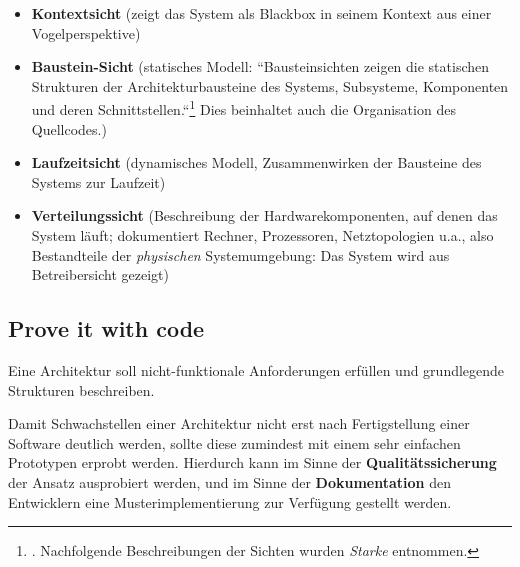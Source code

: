 \begin{itemize}
    \item \textbf{Kontextsicht} (zeigt das System als Blackbox in seinem Kontext aus einer Vogelperspektive)
    \item \textbf{Baustein-Sicht} (statisches Modell: ``Bausteinsichten zeigen die statischen Strukturen der Architekturbausteine des Systems, Subsysteme, Komponenten und deren Schnittstellen.``\footnote{
        \cite[81]{Sta14e}.
        Nachfolgende Beschreibungen der Sichten wurden \textit{Starke} entnommen.
    } Dies beinhaltet auch die Organisation des Quellcodes.)
    \item \textbf{Laufzeitsicht} (dynamisches Modell, Zusammenwirken der Bausteine des Systems zur Laufzeit)
    \item \textbf{Verteilungssicht} (Beschreibung der Hardwarekomponenten, auf denen das System läuft; dokumentiert Rechner, Prozessoren, Netztopologien u.a., also Bestandteile der \textit{physischen} Systemumgebung: Das System wird aus Betreibersicht gezeigt)
\end{itemize}

\subsection*{Prove it with code}

\begin{tcolorbox}
    Eine Architektur soll nicht-funktionale Anforderungen erfüllen und grundlegende Strukturen beschreiben.
\end{tcolorbox}

\noindent
Damit Schwachstellen einer Architektur nicht erst nach Fertigstellung einer Software deutlich werden, sollte diese zumindest mit einem sehr einfachen Prototypen erprobt werden.
Hierdurch kann im Sinne der \textbf{Qualitätssicherung} der Ansatz ausprobiert werden, und im Sinne der \textbf{Dokumentation} den Entwicklern eine Musterimplementierung zur Verfügung gestellt werden.